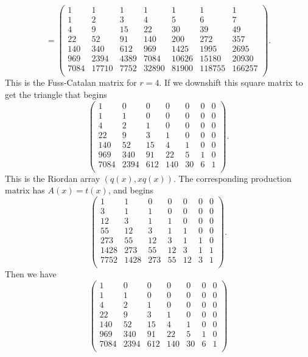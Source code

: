 \documentclass[12pt,reqno]{article}
\theoremstyle{definition}
\begin{document}
$$=\left(
\begin{array}{ccccccc}
1 &1 & 1 & 1 & 1 & 1 & 1 \\
1 & 2 & 3 & 4 & 5 & 6 & 7 \\
4 & 9 & 15 & 22 & 30 & 39 & 49 \\
22 & 52 & 91 & 140 & 200 & 272 & 357 \\
140 & 340 & 612 & 969 & 1425 & 1995 & 2695 \\
969 & 2394 & 4389 & 7084 & 10626 & 15180 & 20930 \\
7084 & 17710 &7752 & 32890 & 81900 & 118755 & 166257 \\
\end{array}\right).$$
This is the Fuss-Catalan matrix for $r=4$. If we downshift this square matrix to get the triangle that begins
$$\left(
\begin{array}{ccccccc}
1& 0 & 0 & 0 & 0 & 0 & 0 \\
1 & 1 & 0 & 0 & 0 & 0 & 0 \\
4 & 2 & 1 & 0 & 0 & 0 & 0 \\
22 & 9 & 3 & 1 & 0 & 0 & 0 \\
140 & 52 & 15 & 4 & 1 & 0 & 0 \\
969 & 340 & 91 & 22 & 5 & 1 & 0 \\
7084 & 2394 & 612 & 140 & 30 & 6 & 1 \\
\end{array}\right).$$  This is the Riordan array $(q(x), xq(x))$. The corresponding production matrix has $A(x)=t(x)$, and begins
$$\left(
\begin{array}{ccccccc}
1& 1 & 0 & 0 & 0 & 0 & 0 \\
3 & 1 & 1 & 0 & 0 & 0 & 0 \\
12 & 3 & 1 & 1 & 0 & 0 & 0 \\
55 & 12 & 3 & 1 & 1 & 0 & 0 \\
273 & 55 & 12 & 3 & 1 & 1 & 0 \\
1428 & 273 & 55 & 12 & 3 & 1 & 1 \\
7752 & 1428 & 273 & 55 & 12 & 3 & 1 \\
\end{array}\right).$$
Then we have
$$\left(
\begin{array}{ccccccc}
1& 0 & 0 & 0 & 0 & 0 & 0 \\
1 & 1 & 0 & 0 & 0 & 0 & 0 \\
4 & 2 & 1 & 0 & 0 & 0 & 0 \\
22 & 9 & 3 & 1 & 0 & 0 & 0 \\
140 & 52 & 15 & 4 & 1 & 0 & 0 \\
969 & 340 & 91 & 22 & 5 & 1 & 0 \\
7084 & 2394 & 612 & 140 & 30 & 6 & 1 \\
\end{array}\right)$$
\end{document}
